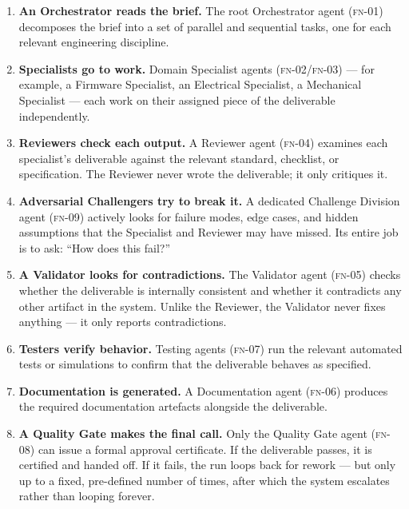 \documentclass[12pt]{article}
\newcommand{\FN}[1]{\textsc{fn-#1}}
\begin{document}
\begin{enumerate}
    \item \textbf{An Orchestrator reads the brief.}
          The root Orchestrator agent (\FN{01}) decomposes the brief
          into a set of parallel and sequential tasks, one for each
          relevant engineering discipline.

    \item \textbf{Specialists go to work.}
          Domain Specialist agents (\FN{02}/\FN{03}) --- for example,
          a Firmware Specialist, an Electrical Specialist, a Mechanical
          Specialist --- each work on their assigned piece of the
          deliverable independently.

    \item \textbf{Reviewers check each output.}
          A Reviewer agent (\FN{04}) examines each specialist's
          deliverable against the relevant standard, checklist, or
          specification.  The Reviewer never wrote the deliverable;
          it only critiques it.

    \item \textbf{Adversarial Challengers try to break it.}
          A dedicated Challenge Division agent (\FN{09}) actively
          looks for failure modes, edge cases, and hidden assumptions
          that the Specialist and Reviewer may have missed.
          Its entire job is to ask: ``How does this fail?''

    \item \textbf{A Validator looks for contradictions.}
          The Validator agent (\FN{05}) checks whether the deliverable
          is internally consistent and whether it contradicts any other
          artifact in the system.  Unlike the Reviewer, the Validator
          never fixes anything --- it only reports contradictions.

    \item \textbf{Testers verify behavior.}
          Testing agents (\FN{07}) run the relevant automated tests
          or simulations to confirm that the deliverable behaves as
          specified.

    \item \textbf{Documentation is generated.}
          A Documentation agent (\FN{06}) produces the required
          documentation artefacts alongside the deliverable.

    \item \textbf{A Quality Gate makes the final call.}
          Only the Quality Gate agent (\FN{08}) can issue a formal
          approval certificate.
          If the deliverable passes, it is certified and handed off.
          If it fails, the run loops back for rework --- but only up
          to a fixed, pre-defined number of times, after which the
          system escalates rather than looping forever.
\end{enumerate}
\end{document}
